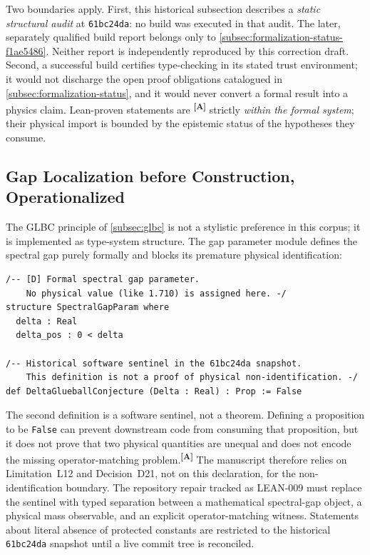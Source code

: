 \documentclass[12pt,a4paper,twoside]{article}
\theoremstyle{plain}
\theoremstyle{definition}
\theoremstyle{remark}
\newcommand{\catmark}[1]{\textsuperscript{\textsf{\textbf{[#1]}}}}
\begin{document}
Two boundaries apply. First, this historical subsection describes a
\emph{static structural audit} at \texttt{61bc24da}: no build was executed
in that audit. The later, separately qualified build report belongs only to
\cref{subsec:formalization-status-f1ae5486}. Neither report is independently
reproduced by this correction draft. Second, a successful build certifies
type-checking in its stated trust environment;
it would not discharge the open proof obligations catalogued in
\cref{subsec:formalization-status}, and it would never convert a formal
result into a physics claim. Lean-proven statements are \catmark{A}
strictly \emph{within the formal system}; their physical import is bounded
by the epistemic status of the hypotheses they consume.

\subsection{Gap Localization before Construction, Operationalized}
\label{subsec:glbc-operational}

The GLBC principle of \cref{subsec:glbc} is not a stylistic preference in
this corpus; it is implemented as type-system structure. The gap parameter
module defines the spectral gap purely formally and blocks its premature
physical identification:

\begin{lstlisting}
/-- [D] Formal spectral gap parameter.
    No physical value (like 1.710) is assigned here. -/
structure SpectralGapParam where
  delta : Real
  delta_pos : 0 < delta

/-- Historical software sentinel in the 61bc24da snapshot.
    This definition is not a proof of physical non-identification. -/
def DeltaGlueballConjecture (Delta : Real) : Prop := False
\end{lstlisting}

The second definition is a software sentinel, not a theorem. Defining a
proposition to be \texttt{False} can prevent downstream code from consuming
that proposition, but it does not prove that two physical quantities are
unequal and does not encode the missing operator-matching problem.\catmark{A}
The manuscript therefore relies on Limitation~L12 and Decision~D21, not on
this declaration, for the non-identification boundary. The repository repair
tracked as LEAN-009 must replace the sentinel with typed separation between a
mathematical spectral-gap object, a physical mass observable, and an explicit
operator-matching witness. Statements about literal absence of protected
constants are restricted to the historical \texttt{61bc24da} snapshot until
a live commit tree is reconciled.
\end{document}
